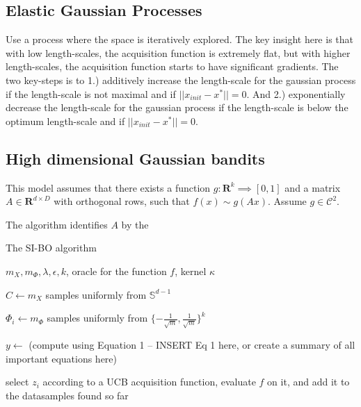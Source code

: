 \subsection{Elastic Gaussian Processes}

\citep{Rana2017} Use a process where the space is iteratively explored.
The key insight here is that with low length-scales, the acquisition function is extremely flat, but with higher length-scales, the acquisition function starts to have significant gradients.
The two key-steps is to 1.) additively increase the length-scale for the gaussian process if the length-scale is not maximal and if $|| x_{init} - x^* || = 0$.
And 2.) exponentially decrease the length-scale for the gaussian process if the length-scale is below the optimum length-scale and if $|| x_{init} - x^* || = 0$.

\subsection{High dimensional Gaussian bandits}

\citep{Djolonga2013} This model assumes that there exists a function $g : \mathbf{R}^k \implies [0, 1]$ and a matrix $A \in \mathbf{R}^{d \times D}$ with orthogonal rows, such that $f(x) \sim g(Ax) $. Assume $g \in \mathcal{C}^2$. 

The algorithm identifies $A$ by the 

\begin{algorithm}
\caption{The SI-BO algorithm \citep{Djolonga2013}}

\begin{algorithmic} 
\REQUIRE $m_X, m_{\Phi}, \lambda, \epsilon, k$, oracle for the function $f$, kernel $\kappa$ 

\STATE $C \leftarrow m_X $ samples uniformly from $\mathbb{S}^{d-1}$

\STATE $\Phi_i \leftarrow m_{\Phi}$ samples uniformly from $\{ -\frac{1}{\sqrt{m}}, \frac{1}{\sqrt{m}} \}^k$
\ENDFOR

\STATE $ y \leftarrow $ (compute using Equation 1 -- INSERT Eq 1 here, or create a summary of all important equations here)

\STATE select $z_i$ according to a UCB acquisition function, evaluate $f$ on it, and add it to the datasamples found so far

\end{algorithmic}

\end{algorithm}

